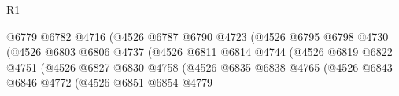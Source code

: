 \begin{lexlean}{R1}
\begin{coremodule}
                                                    @6779
                                                    @6782
                                                    @4716
                                                    (@4526
                                                      @6787
                                                      @6790
                                                      @4723
                                                      (@4526
                                                        @6795
                                                        @6798
                                                        @4730
                                                        (@4526
                                                          @6803
                                                          @6806
                                                          @4737
                                                          (@4526
                                                            @6811
                                                            @6814
                                                            @4744
                                                            (@4526
                                                              @6819
                                                              @6822
                                                              @4751
                                                              (@4526
                                                                @6827
                                                                @6830
                                                                @4758
                                                                (@4526
                                                                  @6835
                                                                  @6838
                                                                  @4765
                                                                  (@4526
                                                                    @6843
                                                                    @6846
                                                                    @4772
                                                                    (@4526
                                                                      @6851
                                                                      @6854
                                                                      @4779

\end{coremodule}
\end{lexlean}
